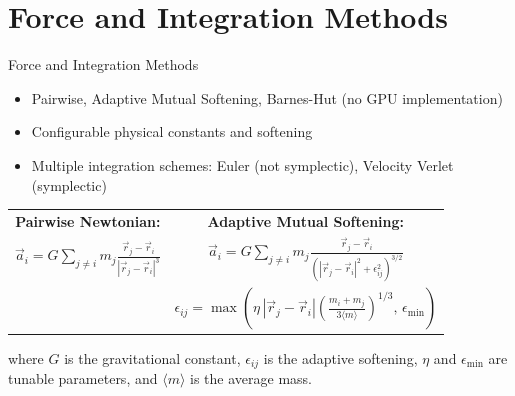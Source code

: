 \documentclass{beamer}
\begin{document}
\section{Force and Integration Methods}
\begin{frame}{Force and Integration Methods}
    \begin{itemize}
        \item Pairwise, Adaptive Mutual Softening, Barnes-Hut (no GPU implementation)
        \item Configurable physical constants and softening
        \item Multiple integration schemes: Euler (not symplectic), Velocity Verlet (symplectic)
    \end{itemize}
    \vspace{1em}
    \begin{center}
    \scriptsize
    \begin{tabular}{cc}
        \textbf{Pairwise Newtonian:} &
        \textbf{Adaptive Mutual Softening:} \\
        $\displaystyle
        \vec{a}_i = G \sum_{j \neq i} m_j \frac{\vec{r}_j - \vec{r}_i}{|\vec{r}_j - \vec{r}_i|^3}
        $ 
        &
        $\displaystyle
        \vec{a}_i = G \sum_{j \neq i} m_j \frac{\vec{r}_j - \vec{r}_i}{\left(|\vec{r}_j - \vec{r}_i|^2 + \epsilon_{ij}^2\right)^{3/2}}
        $
        \\[1.5em]
        &
        $\displaystyle
        \epsilon_{ij} = \max\left(\eta\, |\vec{r}_j - \vec{r}_i| \left(\frac{m_i + m_j}{3 \langle m \rangle}\right)^{1/3},\, \epsilon_{\text{min}}\right)
        $
    \end{tabular}
    \end{center}
    \vspace{0.5em}
    {\footnotesize
    where $G$ is the gravitational constant, $\epsilon_{ij}$ is the adaptive softening, $\eta$ and $\epsilon_{\text{min}}$ are tunable parameters, and $\langle m \rangle$ is the average mass.
    }
\end{frame}
\end{document}
